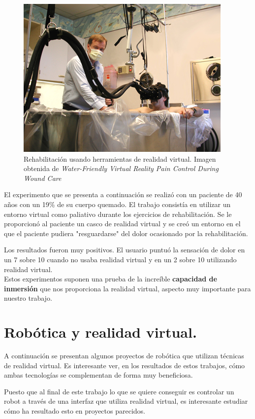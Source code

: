 \documentclass[twoside, 11pt]{epstfg}
\begin{document}
\begin{figure}[H]
	\centerline{
		\mbox{\includegraphics[width=.50\textwidth]{images/waterfriendly.png}}
	}
	\caption{Rehabilitación usando herramientas de realidad virtual. Imagen obtenida de \textit{Water-Friendly Virtual Reality Pain Control During Wound Care} \cite{JCLP:JCLP10244}}
	\label{water}
	
\end{figure}

El experimento que se presenta a continuación se realizó con un paciente de 40 años con un 19\% de su cuerpo quemado. El trabajo consistía en utilizar un entorno virtual como paliativo durante los ejercicios de rehabilitación.
Se le proporcionó al paciente un casco de realidad virtual y se creó un entorno en el que el paciente pudiera "resguardarse" del dolor ocasionado por la rehabilitación.

Los resultados fueron muy positivos. El usuario puntuó la sensación de dolor en un 7 sobre 10 cuando no usaba realidad virtual y en un 2 sobre 10 utilizando realidad virtual.\cite{JCLP:JCLP10244}\\
Estos experimentos suponen una prueba de la increíble \textbf{capacidad de inmersión} que nos proporciona la realidad virtual, aspecto muy importante para nuestro trabajo.



\section{Robótica y realidad virtual.} 
\label{sec:robotica y VR}

A continuación se presentan algunos proyectos de robótica que utilizan técnicas de realidad virtual. Es interesante ver, en los resultados de estos trabajos, cómo ambas tecnologías se complementan de forma muy beneficiosa. \cite{patton2006robotics}

Puesto que al final de este trabajo lo que se quiere conseguir es controlar un robot a través de una interfaz que utiliza realidad virtual, es interesante estudiar cómo ha resultado esto en proyectos parecidos.
\end{document}
